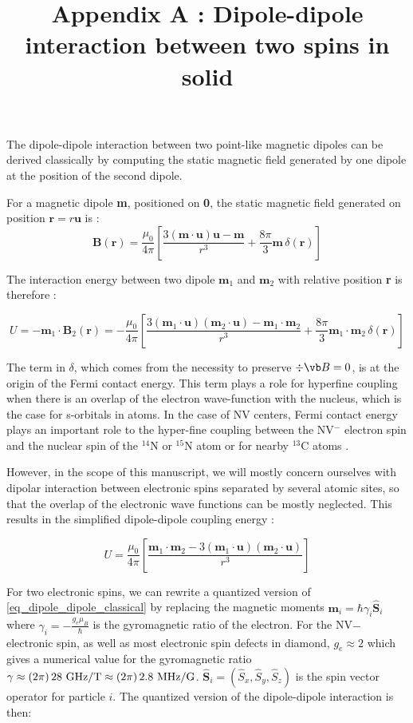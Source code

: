 \documentclass[a4paper]{article}
\title{Appendix A : Dipole-dipole interaction between two spins in solid}
\begin{document}
The dipole-dipole interaction between two point-like magnetic dipoles can be derived classically by computing the static magnetic field generated by one dipole at the position of the second dipole.

For a magnetic dipole \textbf{m}, positioned on \textbf{0}, the static magnetic field generated on position $\mathbf{r}=r\mathbf{u}$ is : \cite[p.~188]{jackson1999classical} 
\begin{equation}
\mathbf{B}(\mathbf{r})=\frac{\mu_0}{4 \pi}\left[ \frac{3 (\mathbf{m}\cdot\mathbf{u})\mathbf{u} - \mathbf{m}}{r^3}+\frac{8\pi}{3}\mathbf{m}\,\delta(\mathbf{r})\right]
\end{equation}

The interaction energy between two dipole $\mathbf{m}_1$ and $\mathbf{m}_2$ with relative position \textbf{r} is therefore :

\begin{equation}
U=-\mathbf{m}_1 \cdot \mathbf{B}_2(\mathbf{r})=-\frac{\mu_0}{4 \pi}\left[ \frac{3 (\mathbf{m}_1\cdot\mathbf{u})(\mathbf{m}_2\cdot\mathbf{u}) - \mathbf{m}_1\cdot\mathbf{m}_2}{r^3}+\frac{8\pi}{3}\mathbf{m}_1\cdot\mathbf{m}_2\,\delta(\mathbf{r})\right]
\end{equation}

The term in $\delta$, which comes from the necessity to preserve $\div{\vb B}=0$, is at the origin of the Fermi contact energy. This term plays a role for hyperfine coupling when there is an overlap of the electron wave-function with the nucleus, which is the case for s-orbitals in atoms. In the case of NV centers, Fermi contact energy plays an important role to the hyper-fine coupling between the NV$^-$ electron spin and the nuclear spin of the $^{14}$N or $^{15}$N atom \cite{doherty2012theory} or for nearby $^{13}$C atoms \cite{smeltzer201113c}.

However, in the scope of this manuscript, we will mostly concern ourselves with dipolar interaction between electronic spins separated by several atomic sites, so that the overlap of the electronic wave functions can be mostly neglected. This results in the simplified dipole-dipole coupling energy :

\begin{equation}
\label{eq_dipole_dipole_classical}
U=\frac{\mu_0}{4 \pi}\left[ \frac{ \mathbf{m}_1\cdot\mathbf{m}_2 - 3 (\mathbf{m}_1\cdot\mathbf{u})(\mathbf{m}_2\cdot\mathbf{u})}{r^3}\right]
\end{equation}

For two electronic spins, we can rewrite a quantized version of \ref{eq_dipole_dipole_classical} by replacing the magnetic moments $\mathbf{m}_i=\hbar \gamma_i \hat{\mathbf{S}}_i$ where $\gamma_i=-\frac{g_e \mu_B}{\hbar}$ is the gyromagnetic ratio of the electron. For the NV$-$ electronic spin, as well as most electronic spin defects in diamond, $g_e\approx 2$ which gives a numerical value for the gyromagnetic ratio $\gamma \approx (2\pi)\,28\ \rm{GHz/T} \approx (2\pi)\,2.8\ \rm MHz/G$. $\hat{\mathbf{S}}_i=(\hat S_x, \hat S_y, \hat S_z)$ is the spin vector operator for particle $i$. The quantized version of the dipole-dipole interaction is then:
\end{document}
